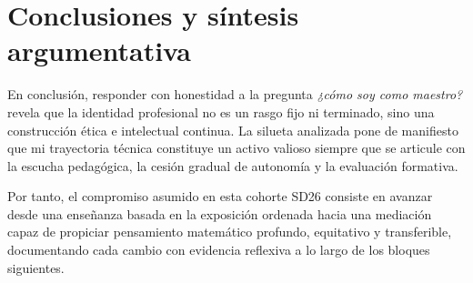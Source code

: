 \documentclass[spanish,letterpaper,oneside]{article}
\begin{document}
\clearpage
\section{Conclusiones y síntesis argumentativa}
En conclusión, responder con honestidad a la pregunta \textit{¿cómo soy como maestro?} revela que la identidad profesional no es un rasgo fijo ni terminado, sino una construcción ética e intelectual continua. La silueta analizada pone de manifiesto que mi trayectoria técnica constituye un activo valioso siempre que se articule con la escucha pedagógica, la cesión gradual de autonomía y la evaluación formativa.

Por tanto, el compromiso asumido en esta cohorte SD26 consiste en avanzar desde una enseñanza basada en la exposición ordenada hacia una mediación capaz de propiciar pensamiento matemático profundo, equitativo y transferible, documentando cada cambio con evidencia reflexiva a lo largo de los bloques siguientes.
\end{document}
